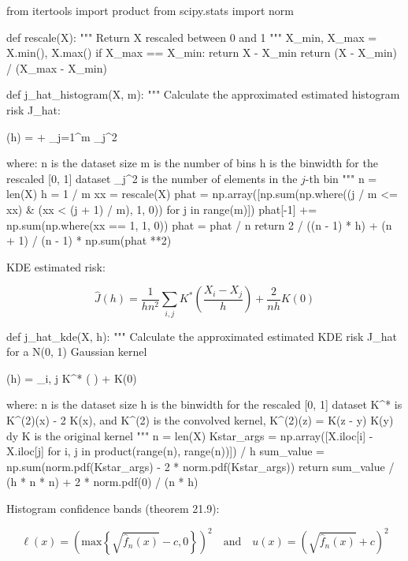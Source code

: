 \begin{python}
from itertools import product
from scipy.stats import norm


def rescale(X):
    """
    Return X rescaled between 0 and 1
    """
    X_min, X_max = X.min(), X.max()
    if X_max == X_min:
        return X - X_min
    return (X - X_min) / (X_max - X_min)


def j_hat_histogram(X, m):
    """
    Calculate the approximated estimated histogram risk J_hat:
    
       (h) =  +  \sum_{j=1}^m _j^2
    
    where:
      n is the dataset size
      m is the number of bins
      h is the binwidth for the rescaled [0, 1] dataset
      _j^2 is the number of elements in the $j$-th bin
    """
    n = len(X)
    h = 1 / m
    xx = rescale(X)
    phat = np.array([np.sum(np.where((j / m <= xx) & (xx < (j + 1) / m), 1, 0)) for j in range(m)])
    phat[-1] += np.sum(np.where(xx == 1, 1, 0))
    phat = phat / n
    return 2 / ((n - 1) * h) + (n + 1) / (n - 1) * np.sum(phat **2)
\end{python}

KDE estimated risk:

\[ \hat{J}(h) = \frac{1}{hn^2}\sum_{i, j} K^* \left( \frac{X_i - X_j}{h} \right) + \frac{2}{nh} K(0) \]

\begin{python}
def j_hat_kde(X, h):
    """
    Calculate the approximated estimated KDE risk J_hat for a N(0, 1) Gaussian kernel
    
      (h) = \sum_{i, j} K^* \left(  \right) +  K(0)
      
    where:
      n is the dataset size
      h is the binwidth for the rescaled [0, 1] dataset
      K^* is K^{(2)}(x) - 2 K(x), and K^{(2)} is the convolved kernel, K^{(2)}(z) = \int K(z - y) K(y) dy
      K is the original kernel
    """
    n = len(X)
    Kstar_args = np.array([X.iloc[i] - X.iloc[j] for i, j in product(range(n), range(n))]) / h
    sum_value = np.sum(norm.pdf(Kstar_args) - 2 * norm.pdf(Kstar_args))
    return sum_value / (h * n * n) + 2 * norm.pdf(0) / (n * h)
\end{python}

Histogram confidence bands (theorem 21.9):

\[
\ell(x) = \left( \text{max} \left\{\sqrt{\hat{f}_n(x)} - c, 0\right\} \right)^2
\quad \text{and} \quad
u(x) = \left(\sqrt{\hat{f}_n(x)} + c \right)^2
\]

